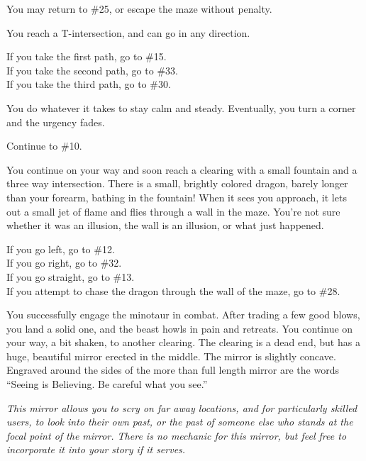 \documentclass[green]{gl2018}
\begin{document}
\begin{large}
\begin{location}{12}
\begin{fromhere}
You may return to \#25, or escape the maze without penalty.
\end{fromhere} 
\end{location}
\begin{location}{13}
You reach a T-intersection, and can go in any direction.
\begin{fromhere}
  If you take the first path, go to \#15.\\
 If you take the second path, go to \#33.\\
 If you take the third path, go to \#30.
\end{fromhere}
\end{location}
\begin{location}{14}
You do whatever it takes to stay calm and steady.  Eventually, you turn a corner and the urgency fades. 
\begin{fromhere}Continue to \#10.\end{fromhere}\end{location}
\begin{location}{15}
You continue on your way and soon reach a clearing with a small fountain and a three way intersection.  There is a small, brightly colored dragon, barely longer than your forearm, bathing in the fountain!  When it sees you approach, it lets out a small jet of flame and flies through a wall in the maze.  You're not sure whether it was an illusion, the wall is an illusion, or what just happened.

\begin{fromhere}
   If you go left, go to \#12.\\
 If you go right, go to \#32.\\ 
If you go straight, go to \#13.\\
If you attempt to chase the dragon through the wall of the maze, go to \#28.
\end{fromhere}
\end{location}
\begin{location}{16}
You successfully engage the minotaur in combat. After trading a few good blows, you land a solid one, and the beast howls in pain and retreats. You continue on your way, a bit shaken, to another clearing. The clearing is a dead end, but has a huge, beautiful mirror erected in the middle. The mirror is slightly concave. Engraved around the sides of the more than full length mirror are the words ``Seeing is Believing. Be careful what you see.''

\emph{This mirror allows you to scry on far away locations, and for particularly skilled users, to look into their own past, or the past of someone else who stands at the focal point of the mirror. There is no mechanic for this mirror, but feel free to incorporate it into your story if it serves.}


\end{location}
\end{large}
\end{document}
